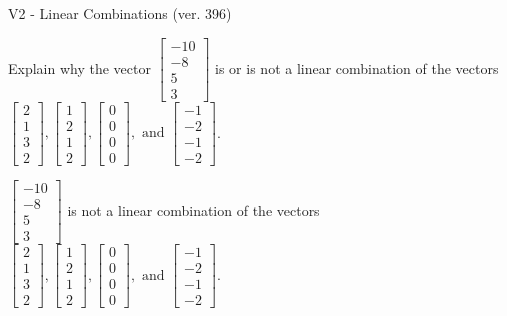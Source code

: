 \begin{exercise}
  \begin{exerciseTitle}V2 - Linear Combinations (ver. 396)\end{exerciseTitle}
  \begin{exerciseStatement}
    Explain why the vector \(\left[\begin{array}{c}
-10 \\
-8 \\
5 \\
3
\end{array}\right]\)  is or is not a linear 
	combination of the vectors \(\left[\begin{array}{c}
2 \\
1 \\
3 \\
2
\end{array}\right] , \left[\begin{array}{c}
1 \\
2 \\
1 \\
2
\end{array}\right] , \left[\begin{array}{c}
0 \\
0 \\
0 \\
0
\end{array}\right] , \text{ and } \left[\begin{array}{c}
-1 \\
-2 \\
-1 \\
-2
\end{array}\right]\).
	


  \end{exerciseStatement}
  \begin{exerciseAnswer}
   \(\left[\begin{array}{c}
-10 \\
-8 \\
5 \\
3
\end{array}\right]\) 
  	 is not  
	a linear combination of the vectors \(\left[\begin{array}{c}
2 \\
1 \\
3 \\
2
\end{array}\right] , \left[\begin{array}{c}
1 \\
2 \\
1 \\
2
\end{array}\right] , \left[\begin{array}{c}
0 \\
0 \\
0 \\
0
\end{array}\right] , \text{ and } \left[\begin{array}{c}
-1 \\
-2 \\
-1 \\
-2
\end{array}\right]\).


\end{exerciseAnswer}
\end{exercise}
